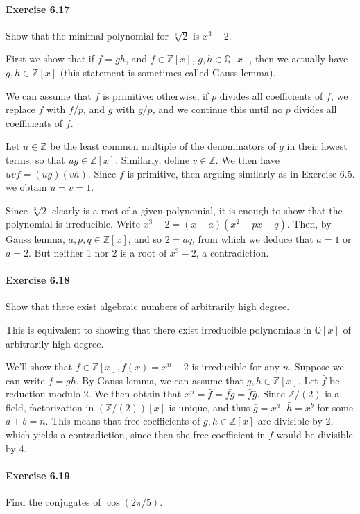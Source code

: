 \documentclass[notitlepage]{article}
\theoremstyle{definition}
\newcommand\Q{\mathbb{Q}}
\newcommand\Z{\mathbb{Z}}
\begin{document}
\paragraph{Exercise 6.17}
Show that the minimal polynomial for $\sqrt[3]{2}$ is $x^3 -2$.

First we show that if $f = gh$, and $f \in \Z[x]$, $g, h \in \Q[x]$,
then we actually have $g, h \in \Z[x]$ (this statement is sometimes
called Gauss lemma).

We can assume that $f$ is primitive: otherwise, if $p$ divides all
coefficients of $f$, we replace $f$ with $f/p$, and $g$ with $g/p$,
and we continue this until no $p$ divides all coefficients of $f$.

Let $u \in \Z$ be the least common multiple of the denominators of $g$
in their lowest terms, so that $ug \in \Z[x]$. Similarly, define $v
\in \Z$. We then have $uvf = (ug)(vh)$. Since $f$ is primitive, then
arguing similarly as in Exercise 6.5. we obtain $u = v = 1$. 

Since $\sqrt[3]{2}$ clearly is a root of a given polynomial, it is
enough to show that the polynomial is irreducible. Write $x^3 - 2 =
(x-a)(x^2 + px + q)$. Then, by Gauss lemma, $a, p, q \in \Z[x]$, and
so $2 = aq$, from which we deduce that $a = 1$ or $a = 2$. But neither
1 nor 2 is a root of $x^3 - 2$, a contradiction.

\paragraph{Exercise 6.18}
Show that there exist algebraic numbers of arbitrarily high degree.

This is equivalent to showing that there exist irreducible polynomials
in $\Q[x]$ of arbitrarily high degree.

We'll show that $f \in \Z[x], f(x) = x^n - 2$ is irreducible for any
$n$. Suppose we can write $f = gh$. By Gauss lemma, we can assume that
$g, h \in \Z[x]$. Let $\bar{f}$ be reduction modulo 2. We then obtain
that $x^n = \bar{f} = \bar{fg} = \bar{f}\bar{g}$. Since $\Z/(2)$ is a
field, factorization in $(\Z/(2))[x]$ is unique, and thus $\bar{g} =
x^a$, $\bar{h} = x^b$ for some $a + b = n$. This means that free
coefficients of $g, h \in \Z[x]$ are divisible by 2, which yields a
contradiction, since then the free coefficient in $f$ would be
divisible by 4.

\paragraph{Exercise 6.19}
Find the conjugates of $\cos(2 \pi/5)$.
\end{document}
